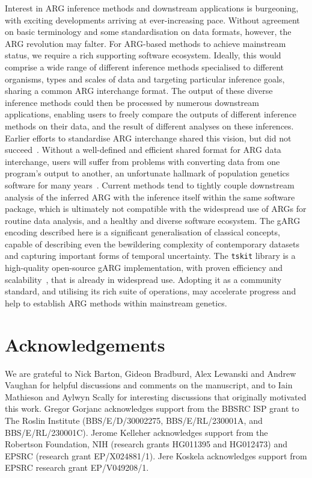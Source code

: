 \documentclass{article}
\begin{document}
Interest in ARG inference methods and downstream applications is
burgeoning, with exciting developments arriving at ever-increasing pace.
Without agreement on basic terminology and some standardisation
on data formats, however, the ARG revolution may falter.
For ARG-based methods to achieve mainstream status, we require
a rich supporting software ecosystem.
Ideally, this would comprise a wide range of different
inference methods specialised to different organisms, types
and scales of data and
targeting particular inference goals, sharing a common ARG interchange format.
The output of these diverse inference methods could then be
processed by numerous downstream applications,
enabling users to freely compare the outputs of different
inference methods on their data, and the result of different
analyses on these inferences.
Earlier efforts to standardise ARG interchange shared this vision,
but did not succeed~\citep{cardona2008extended,mcgill2013graphml}.
Without a well-defined and efficient shared format
for ARG data interchange,
users will suffer from problems with converting data from one program's
output to another, an unfortunate hallmark of population genetics
software for many years~\citep{excoffier2006computer}.
Current methods tend to tightly couple downstream analysis
of the inferred ARG with the inference
itself within the same software package,
which is ultimately not compatible with the widespread use
of ARGs for routine data analysis, and a healthy and diverse software ecosystem.
The gARG encoding described here is a significant generalisation
of classical concepts, capable of describing even the bewildering complexity
of contemporary datasets and capturing important forms of temporal uncertainty.
The \texttt{tskit} library is a high-quality open-source gARG implementation,
with proven efficiency and
scalability~\citep[e.g.][]{anderson2022genes,zhan2023towards},
that is already in widespread use.
Adopting it as a community standard,
and utilising its rich suite of operations,
may accelerate progress and help to
establish ARG methods within mainstream genetics.

\section*{Acknowledgements}
We are grateful to Nick Barton, Gideon Bradburd, Alex Lewanski and Andrew Vaughan
for helpful discussions and comments on the manuscript, and 
to Iain Mathieson and Aylwyn Scally for interesting discussions that 
originally motivated this work.
Gregor Gorjanc acknowledges support from the BBSRC ISP grant to The Roslin Institute
(BBS/E/D/30002275, BBS/E/RL/230001A, and BBS/E/RL/230001C).
Jerome Kelleher acknowledges support from the Robertson Foundation,
NIH (research grants HG011395 and HG012473) and
EPSRC (research grant EP/X024881/1).
Jere Koskela acknowledges support from EPSRC research grant EP/V049208/1.
\end{document}
